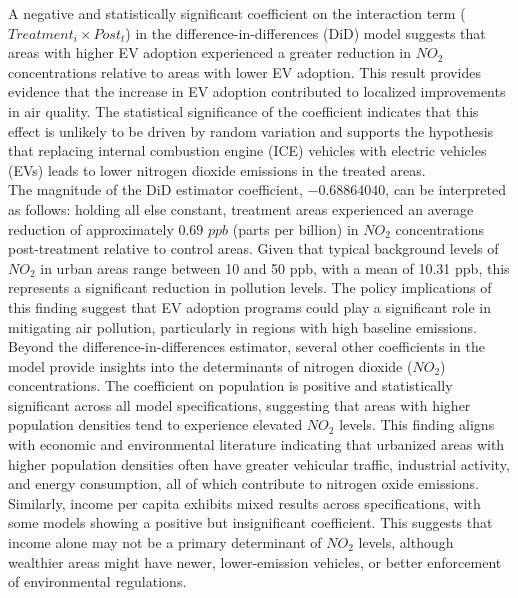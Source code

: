 \documentclass[12pt]{article}
\newcommand\tab[1][.50cm]{\hspace*{#1}}
\begin{document}
\begin{multicols}{2}
		
		A negative and statistically significant coefficient on the interaction term ($Treatment_i \times Post_t$) in the difference-in-differences (DiD) model suggests that areas with higher EV adoption experienced a greater reduction in $NO_2$ concentrations relative to areas with lower EV adoption. This result provides evidence that the increase in EV adoption contributed to localized improvements in air quality. The statistical significance of the coefficient indicates that this effect is unlikely to be driven by random variation and supports the hypothesis that replacing internal combustion engine (ICE) vehicles with electric vehicles (EVs) leads to lower nitrogen dioxide emissions in the treated areas.\\
		\tab The magnitude of the DiD estimator coefficient, $-0.68864040$, can be interpreted as follows: holding all else constant, treatment areas experienced an average reduction of approximately $0.69$ $ppb$ (parts per billion) in $NO_2$ concentrations post-treatment relative to control areas. Given that typical background levels of $NO_2$ in urban areas range between 10 and 50 ppb, with a mean of 10.31 ppb, this represents a significant reduction in pollution levels. The policy implications of this finding suggest that EV adoption programs could play a significant role in mitigating air pollution, particularly in regions with high baseline emissions.\\
		\tab Beyond the difference-in-differences estimator, several other coefficients in the model provide insights into the determinants of nitrogen dioxide ($NO_2$) concentrations. The coefficient on population is positive and statistically significant across all model specifications, suggesting that areas with higher population densities tend to experience elevated $NO_2$ levels. This finding aligns with economic and environmental literature indicating that urbanized areas with higher population densities often have greater vehicular traffic, industrial activity, and energy consumption, all of which contribute to nitrogen oxide emissions. Similarly, income per capita exhibits mixed results across specifications, with some models showing a positive but insignificant coefficient. This suggests that income alone may not be a primary determinant of $NO_2$ levels, although wealthier areas might have newer, lower-emission vehicles, or better enforcement of environmental regulations.\\

\end{multicols}
\end{document}
